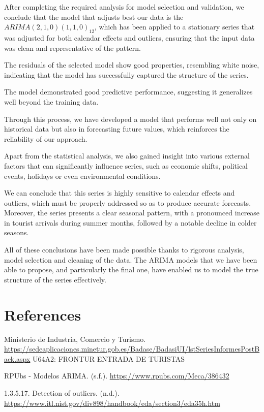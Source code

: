 \documentclass[
]{article}
\begin{document}
After completing the required analysis for model selection and
validation, we conclude that the model that adjusts best our data is the
\textbf{\(ARIMA(2, 1, 0)(1, 1, 0)_{12}\)}, which has been applied to a
stationary series that was adjusted for both calendar effects and
outliers, ensuring that the input data was clean and representative of
the pattern.

The residuals of the selected model show good properties, resembling
white noise, indicating that the model has successfully captured the
structure of the series.

The model demonstrated good predictive performance, suggesting it
generalizes well beyond the training data.

Through this process, we have developed a model that performs well not
only on historical data but also in forecasting future values, which
reinforces the reliability of our approach.

Apart from the statistical analysis, we also gained insight into various
external factors that can significantly influence series, such as
economic shifts, political events, holidays or even environmental
conditions.

We can conclude that this series is highly sensitive to calendar effects
and outliers, which must be properly addressed so as to produce accurate
forecasts. Moreover, the series presents a clear seasonal pattern, with
a pronounced increase in tourist arrivals during summer months, followed
by a notable decline in colder seasons.

All of these conclusions have been made possible thanks to rigorous
analysis, model selection and cleaning of the data. The ARIMA models
that we have been able to propose, and particularly the final one, have
enabled us to model the true structure of the series effectively.
\newpage

\hypertarget{references}{%
\section{References}\label{references}}

Ministerio de Industria, Comercio y Turismo.
\url{https://sedeaplicaciones.minetur.gob.es/Badase/BadasiUI/lstSeriesInformesPostBack.aspx}
U64A2: FRONTUR ENTRADA DE TURISTAS

RPUbs - Modelos ARIMA. (s.f.). \url{https://www.rpubs.com/Meca/386432}

1.3.5.17. Detection of outliers. (n.d.).
\url{https://www.itl.nist.gov/div898/handbook/eda/section3/eda35h.htm}
\end{document}
